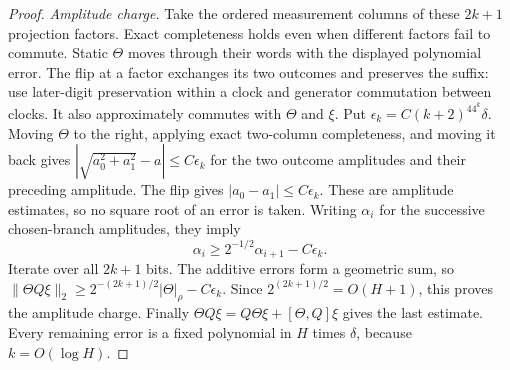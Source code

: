 \begin{proof}
\par\smallskip\noindent\textit{Amplitude charge.}\quad
Take the ordered measurement columns of these $2k+1$ projection factors. Exact completeness holds even when different factors fail to commute. Static $\Theta$ moves through their words with the displayed polynomial error. The flip at a factor exchanges its two outcomes and preserves the suffix: use later-digit preservation within a clock and generator commutation between clocks. It also approximately commutes with $\Theta$ and $\xi$. Put $\epsilon_k=C(k+2)^44^k\delta$. Moving $\Theta$ to the right, applying exact two-column completeness, and moving it back gives $|\sqrt{a_0^2+a_1^2}-a|\le C\epsilon_k$ for the two outcome amplitudes and their preceding amplitude. The flip gives $|a_0-a_1|\le C\epsilon_k$. These are amplitude estimates, so no square root of an error is taken. Writing $\alpha_i$ for the successive chosen-branch amplitudes, they imply
\[
 \alpha_i\ge2^{-1/2}\alpha_{i+1}-C\epsilon_k.
\]
Iterate over all $2k+1$ bits. The additive errors form a geometric sum, so $\|\Theta Q\xi\|_2\ge2^{-(2k+1)/2}|\Theta|_\rho-C\epsilon_k$. Since $2^{(2k+1)/2}=O(H+1)$, this proves the amplitude charge. Finally $\Theta Q\xi=Q\Theta\xi+[\Theta,Q]\xi$ gives the last estimate. Every remaining error is a fixed polynomial in $H$ times $\delta$, because $k=O(\log H)$.
\end{proof}
